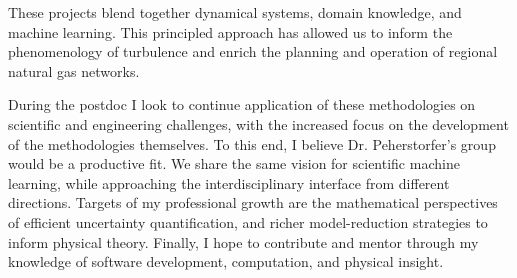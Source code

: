 \documentclass[11pt,a4paper,sans]{moderncv}        %
\begin{document}
These projects blend together dynamical systems, domain knowledge, and machine learning. This principled approach has allowed us to inform the phenomenology of turbulence and enrich the planning and operation of regional natural gas networks.

During the postdoc I look to continue application of these methodologies on scientific and engineering challenges, with the increased focus on the development of the methodologies themselves. To this end, I believe Dr. Peherstorfer's group would be a productive fit. We share the same vision for scientific machine learning, while approaching the interdisciplinary interface from different directions. Targets of my professional growth are the mathematical perspectives of efficient uncertainty quantification, and richer model-reduction strategies to inform physical theory. Finally, I hope to contribute and mentor through my knowledge of software development, computation, and physical insight.

\vspace{0.4in}
\makeletterclosing
\end{document}
